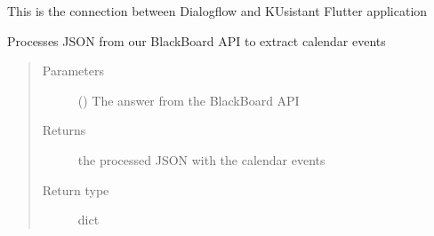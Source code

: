 \documentclass[letterpaper,10pt,english]{sphinxmanual}
\begin{document}
\begin{fulllineitems}
\label{\detokenize{DialogFlow_Bridge_API:DialogFlow_Bridge_API.KUSISCookie}}
\pysigstartsignatures
{}
\pysigstopsignatures
\sphinxAtStartPar
This is the connection between Dialogflow and KUsistant Flutter application

\end{fulllineitems}


\begin{fulllineitems}
\label{\detokenize{DialogFlow_Bridge_API:DialogFlow_Bridge_API.getCalendarEvents}}
\pysigstartsignatures
{}
\pysigstopsignatures
\sphinxAtStartPar
Processes JSON from our BlackBoard API to extract calendar events
\begin{quote}\begin{description}
\item[{Parameters}] \leavevmode
\sphinxAtStartPar
{} () \textendash{} The answer from the BlackBoard API

\item[{Returns}] \leavevmode
\sphinxAtStartPar
the processed JSON with the calendar events

\item[{Return type}] \leavevmode
\sphinxAtStartPar
dict

\end{description}\end{quote}

\end{fulllineitems}

\end{document}

